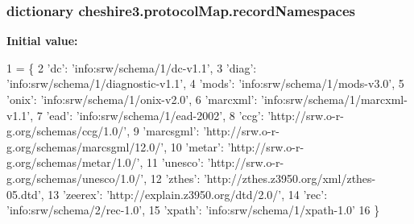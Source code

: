 \hypertarget{namespacecheshire3_1_1protocol_map_a46365edb8ea3535b6970d35aad6179fa}{
\subsubsection[{record\-Namespaces}]{\setlength{\rightskip}{0pt plus 5cm}dictionary cheshire3.\-protocol\-Map.\-record\-Namespaces}}\label{namespacecheshire3_1_1protocol_map_a46365edb8ea3535b6970d35aad6179fa}
{\bfseries Initial value\-:}
\begin{DoxyCode}
1 = \{
2   \textcolor{stringliteral}{'dc'}: \textcolor{stringliteral}{'info:srw/schema/1/dc-v1.1'},
3   \textcolor{stringliteral}{'diag'}: \textcolor{stringliteral}{'info:srw/schema/1/diagnostic-v1.1'},
4   \textcolor{stringliteral}{'mods'}: \textcolor{stringliteral}{'info:srw/schema/1/mods-v3.0'},
5   \textcolor{stringliteral}{'onix'}: \textcolor{stringliteral}{'info:srw/schema/1/onix-v2.0'},
6   \textcolor{stringliteral}{'marcxml'}: \textcolor{stringliteral}{'info:srw/schema/1/marcxml-v1.1'},
7   \textcolor{stringliteral}{'ead'}: \textcolor{stringliteral}{'info:srw/schema/1/ead-2002'},
8   \textcolor{stringliteral}{'ccg'}: \textcolor{stringliteral}{'http://srw.o-r-g.org/schemas/ccg/1.0/'},
9   \textcolor{stringliteral}{'marcsgml'}: \textcolor{stringliteral}{'http://srw.o-r-g.org/schemas/marcsgml/12.0/'},
10   \textcolor{stringliteral}{'metar'}: \textcolor{stringliteral}{'http://srw.o-r-g.org/schemas/metar/1.0/'},
11   \textcolor{stringliteral}{'unesco'}: \textcolor{stringliteral}{'http://srw.o-r-g.org/schemas/unesco/1.0/'},
12   \textcolor{stringliteral}{'zthes'}: \textcolor{stringliteral}{'http://zthes.z3950.org/xml/zthes-05.dtd'},
13   \textcolor{stringliteral}{'zeerex'}: \textcolor{stringliteral}{'http://explain.z3950.org/dtd/2.0/'},
14   \textcolor{stringliteral}{'rec'}: \textcolor{stringliteral}{'info:srw/schema/2/rec-1.0'},
15   \textcolor{stringliteral}{'xpath'}: \textcolor{stringliteral}{'info:srw/schema/1/xpath-1.0'}
16 \}
\end{DoxyCode}
